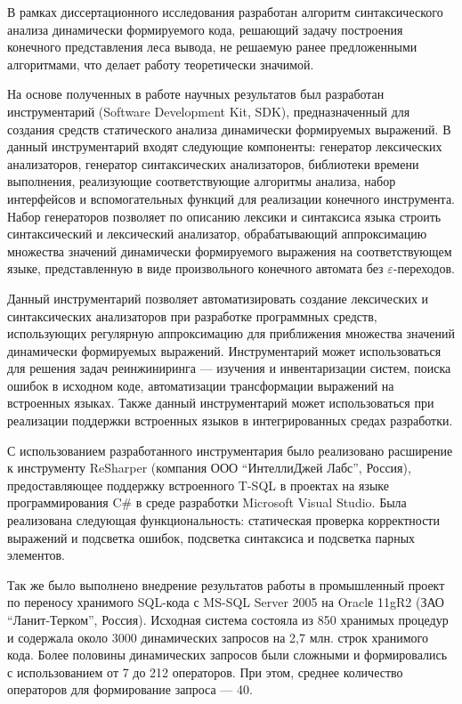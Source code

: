 В рамках диссертационного исследования разработан алгоритм синтаксического анализа динамически формируемого кода, решающий задачу построения конечного представления леса вывода, не решаемую ранее предложенными алгоритмами, что делает работу теоретически значимой.

На основе полученных в работе научных результатов был разработан инструментарий (Software Development Kit, SDK), предназначенный для создания средств статического анализа динамически формируемых выражений. В данный инструментарий входят следующие компоненты: генератор лексических анализаторов, генератор синтаксических анализаторов, библиотеки времени выполнения, реализующие соответствующие алгоритмы анализа, набор интерфейсов и вспомогательных функций для реализации конечного инструмента. Набор генераторов позволяет по описанию лексики и синтаксиса языка строить синтаксический и лексический анализатор, обрабатывающий аппроксимацию множества значений динамически формируемого выражения на соответствующем языке, представленную в виде произвольного конечного автомата без $\varepsilon$-переходов.

Данный инструментарий позволяет автоматизировать создание лексических и синтаксических анализаторов при разработке программных средств, использующих регулярную аппроксимацию для приближения множества значений динамически формируемых выражений. Инструментарий может использоваться  для решения задач реинжиниринга --- изучения и инвентаризации систем, поиска ошибок в исходном коде, автоматизации трансформации выражений на встроенных языках. Также данный инструментарий может использоваться при реализации поддержки встроенных языков в интегрированных средах разработки.

С использованием разработанного инструментария было реализовано расширение к инструменту ReSharper (компания ООО ``ИнтеллиДжей Лабс'', Россия), предоставляющее поддержку встроенного T-SQL в проектах на языке программирования C\# в среде разработки Microsoft Visual Studio. Была реализована следующая функциональность: статическая проверка корректности выражений и подсветка ошибок, подсветка синтаксиса и подсветка парных элементов.

Так же было выполнено внедрение результатов работы в промышленный проект по переносу хранимого SQL-кода с MS-SQL Server 2005 на Oraclе 11gR2 (ЗАО ``Ланит-Терком'', Россия). Исходная система состояла из 850 хранимых процедур и содержала около 3000 динамических запросов на 2,7 млн. строк хранимого кода. Более половины динамических запросов были сложными и формировались с использованием от 7 до 212 операторов. При этом, среднее количество операторов для формирование запроса ---  40.

